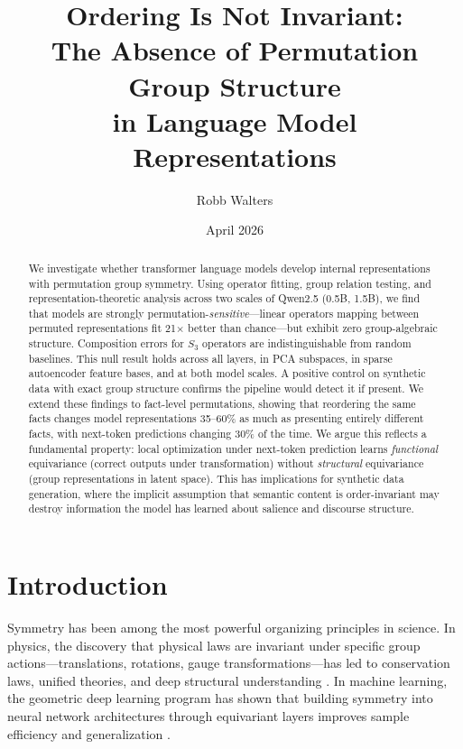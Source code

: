 \documentclass[10pt, letterpaper]{article}
\title{Ordering Is Not Invariant:\\ The Absence of Permutation Group Structure\\ in Language Model Representations}
\author{Robb Walters}
\date{April 2026}
\begin{document}
\maketitle

\begin{abstract}
We investigate whether transformer language models develop internal representations with permutation group symmetry. Using operator fitting, group relation testing, and representation-theoretic analysis across two scales of Qwen2.5 (0.5B, 1.5B), we find that models are strongly permutation-\emph{sensitive}---linear operators mapping between permuted representations fit 21$\times$ better than chance---but exhibit zero group-algebraic structure. Composition errors for $S_3$ operators are indistinguishable from random baselines. This null result holds across all layers, in PCA subspaces, in sparse autoencoder feature bases, and at both model scales. A positive control on synthetic data with exact group structure confirms the pipeline would detect it if present. We extend these findings to fact-level permutations, showing that reordering the same facts changes model representations 35--60\% as much as presenting entirely different facts, with next-token predictions changing 30\% of the time. We argue this reflects a fundamental property: local optimization under next-token prediction learns \emph{functional} equivariance (correct outputs under transformation) without \emph{structural} equivariance (group representations in latent space). This has implications for synthetic data generation, where the implicit assumption that semantic content is order-invariant may destroy information the model has learned about salience and discourse structure.
\end{abstract}

\section{Introduction}
\label{sec:intro}

Symmetry has been among the most powerful organizing principles in science. In physics, the discovery that physical laws are invariant under specific group actions---translations, rotations, gauge transformations---has led to conservation laws, unified theories, and deep structural understanding \cite{noether1918, weyl1952}. In machine learning, the geometric deep learning program has shown that building symmetry into neural network architectures through equivariant layers improves sample efficiency and generalization \cite{bronstein2021geometric, cohen2016group}.
\end{document}
